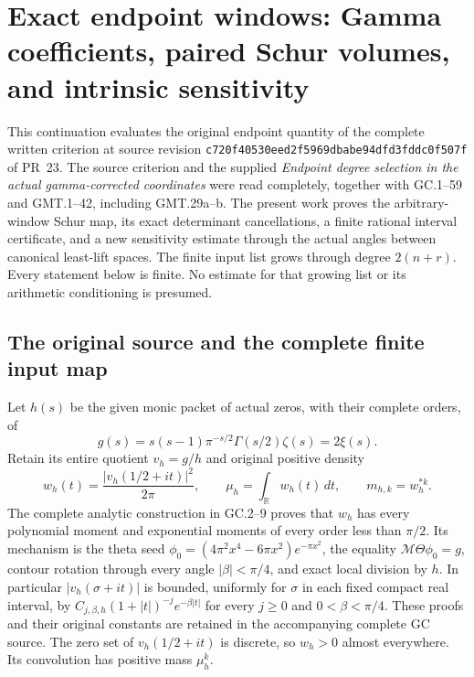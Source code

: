 \begingroup
\def\C{\mathbb C}
\def\R{\mathbb R}
\def\Tr{\operatorname{Tr}}
\def\diag{\operatorname{diag}}
\section{Exact endpoint windows: Gamma coefficients, paired Schur volumes, and intrinsic sensitivity}



This continuation evaluates the original endpoint quantity of the complete
written criterion at source revision
\texttt{c720f40530eed2f5969dbabe94dfd3fddc0f507f} of PR~23.
The source criterion and the supplied \emph{Endpoint degree selection in
the actual gamma-corrected coordinates} were read completely, together
with GC.1--59 and GMT.1--42, including GMT.29a--b. The present work proves
the arbitrary-window Schur map, its exact determinant cancellations, a
finite rational interval certificate, and a new sensitivity estimate
through the actual angles between canonical least-lift spaces. The
finite input list grows through degree $2(n+r)$. Every statement below
is finite. No estimate for that growing list or its arithmetic
conditioning is presumed.

\subsection{The original source and the complete finite input map}

Let $h(s)$ be the given monic packet of actual zeros, with their complete
orders, of
\[
 g(s)=s(s-1)\pi^{-s/2}\Gamma(s/2)\zeta(s)=2\xi(s).
\]
Retain its entire quotient $v_h=g/h$ and original positive density
\[
 w_h(t)=\frac{|v_h(1/2+it)|^2}{2\pi},\qquad
 \mu_h=\int_\R w_h(t)\,dt,\qquad m_{h,k}=w_h^{*k}.
                                                               \tag{EW.1}
\]
The complete analytic construction in GC.2--9 proves that $w_h$ has
every polynomial moment and exponential moments of every order less
than $\pi/2$. Its mechanism is the theta seed
$\phi_0=(4\pi^2x^4-6\pi x^2)e^{-\pi x^2}$, the equality
$\mathcal M\Theta\phi_0=g$, contour rotation through every angle
$|\beta|<\pi/4$, and exact local division by $h$.
In particular $|v_h(\sigma+it)|$ is bounded, uniformly for $\sigma$
in each fixed compact real interval, by
$C_{j,\beta,h}(1+|t|)^{-j}e^{-\beta|t|}$ for every
$j\ge0$ and $0<\beta<\pi/4$. These proofs and their original
constants are retained in the accompanying complete GC source.
The zero set of $v_h(1/2+it)$ is discrete, so $w_h>0$ almost
everywhere. Its convolution has positive mass $\mu_h^k$.


